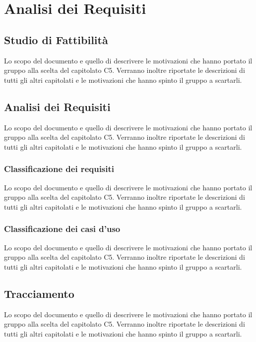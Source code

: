 \section{Analisi dei Requisiti}
\subsection{Studio di Fattibilità}
Lo scopo del documento e quello di descrivere le motivazioni che hanno portato il gruppo alla scelta del capitolato C5.
Verranno inoltre riportate le descrizioni di tutti gli altri capitolati e le motivazioni che hanno spinto il gruppo a scartarli.

\subsection{Analisi dei Requisiti}
Lo scopo del documento e quello di descrivere le motivazioni che hanno portato il gruppo alla scelta del capitolato C5.
Verranno inoltre riportate le descrizioni di tutti gli altri capitolati e le motivazioni che hanno spinto il gruppo a scartarli.

\subsubsection{Classificazione dei requisiti}
Lo scopo del documento e quello di descrivere le motivazioni che hanno portato il gruppo alla scelta del capitolato C5.
Verranno inoltre riportate le descrizioni di tutti gli altri capitolati e le motivazioni che hanno spinto il gruppo a scartarli.

\subsubsection{Classificazione dei casi d'uso}
Lo scopo del documento e quello di descrivere le motivazioni che hanno portato il gruppo alla scelta del capitolato C5.
Verranno inoltre riportate le descrizioni di tutti gli altri capitolati e le motivazioni che hanno spinto il gruppo a scartarli.

\subsection{Tracciamento}
Lo scopo del documento e quello di descrivere le motivazioni che hanno portato il gruppo alla scelta del capitolato C5.
Verranno inoltre riportate le descrizioni di tutti gli altri capitolati e le motivazioni che hanno spinto il gruppo a scartarli.
